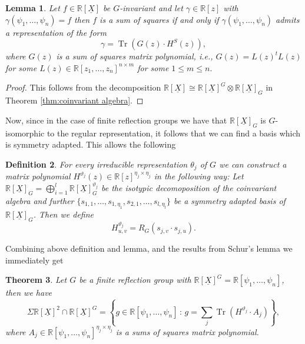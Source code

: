\documentclass[11pt,a4paper]{amsart}
\numberwithin{equation}{section}
\newtheorem{thm}{Theorem}
\newtheorem{lemma}[thm]{Lemma}
\newtheorem{definition}[thm]{Definition}
\theoremstyle{definition}
\newcommand{\R}{\mathbb{R}}
\DeclareMathOperator{\Tr}{Tr}
\numberwithin{thm}{section}
\theoremstyle{break}
\numberwithin{subcase}{case}
\begin{document}
\begin{lemma}
Let $f\in\R[\underline{X}]$ be $G$-invariant and let $\gamma\in\R[z]$ with $\gamma(\psi_1,\ldots,\psi_n)=f$ then $f$ is a sum of squares if and only if $\gamma(\psi_1,\ldots,\psi_n)$ admits a representation of the form
$$\gamma= \Tr (G(z)\cdot H^S(z)),$$
where $G(z)$ is a sum of squares matrix polynomial, i.e., $G(z)=L(z)^tL(z)$ for some $L(z)\in\R[z_1,\ldots,z_n]^{n\times m}$ for some $1\leq m\leq n.$
\end{lemma}
\begin{proof}
This follows from the decomposition $\R[\underline{X}]\cong \R[\underline{X}]^G \otimes \R[\underline{X}]_G$ in Theorem \ref{thm:coinvariant algebra}.
\end{proof}

Now, since in the case of finite reflection groups we have that $\R[\underline{X}]_G$ is $G$-isomorphic to the regular representation, it follows that we can find a basis which is symmetry adapted.
This allows the following 

\begin{definition}
For every irreducible representation $\theta_j$ of $G$ we can construct a matrix polynomial $H^{\vartheta_j}(z)\in\R[z]^{\eta_j\times\eta_j}$ in the following way: 
Let $\R[\underline{X}]_G=\bigoplus_{i=1}^l \R[\underline{X}]_G^{\vartheta_j}$ be the isotypic decomoposition of the coinvariant algebra and further $\{s_{1,1},\ldots,s_{1,\eta_1},s_{2,1},\ldots,s_{l,\eta_l}\}$ be a symmetry adapted basis of $\R[\underline{X}]_G$.
Then we define $$H^{\vartheta_j}_{u,v}=R_G(s_{j,v}\cdot s_{j,u}).$$
\end{definition}
Combining above definition and lemma, and the results from Schur's lemma we immediately get
\begin{thm}\label{thm:sums of squares description}
Let $G$ be a finite reflection group with $\R[\underline{X}]^G =\R[\psi_1,\ldots,\psi_n]$, then we have
$$\Sigma \R[\underline{X}]^2 \cap \R[\underline{X}]^G= \left\{ g\in \R[\psi_1,\ldots,\psi_n]\,:\, g=\sum_{j} \Tr(H^{\vartheta_j}\cdot A_j)\right\},$$
where $A_j\in{ \R[\psi_1,\ldots,\psi_n]}^{\eta_j\times\eta_j}$ is a sums of squares matrix polynomial.
\end{thm}
\end{document}
